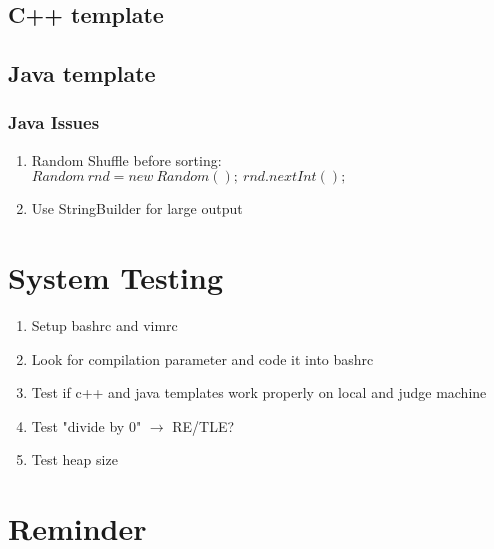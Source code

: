\documentclass[10pt,oneside]{article}
\begin{document}
\begin{landscape}
\begin{multicols}{2}
\subsection{C++ template}


\subsection{Java template}


\subsubsection{Java Issues}
\begin{enumerate}
	\item Random Shuffle before sorting: $Random\ rnd = new\ Random();\ rnd.nextInt();$
	\item Use StringBuilder for large output
\end{enumerate}

\section{System Testing}

\begin{enumerate}
	\item Setup bashrc and vimrc
	\item Look for compilation parameter and code it into bashrc
	\item Test if c++ and java templates work properly on local and judge machine
	\item Test "divide by 0" $\rightarrow$ RE/TLE?
	\item Test heap size
\end{enumerate}


\section{Reminder}


\end{multicols}
\end{landscape}
\end{document}
